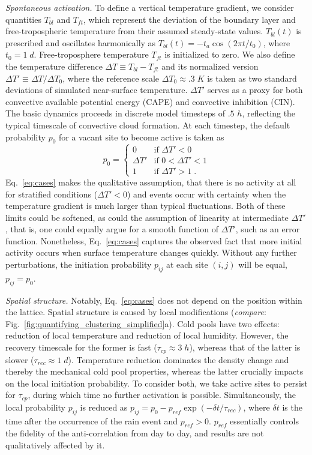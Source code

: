 \documentclass[draft,linenumbers]{agujournal2019}
\begin{document}
\noindent
{\it Spontaneous activation.}
To define a vertical temperature gradient, we consider quantities $T_{bl}$ and $T_{ft}$, which represent the deviation of the boundary layer and free-tropospheric temperature from their assumed steady-state values.
$T_{bl}(t)$ is prescribed and oscillates harmonically as $T_{bl}(t)=-t_a \cos (2\pi t/t_0)$, where $t_0=1\;d$.
Free-troposphere temperature $T_{ft}$ is initialized to zero.
We also define the temperature difference $\Delta T\equiv T_{bl}-T_{ft}$ and its normalized version $\Delta T'\equiv \Delta T/\Delta T_0$, where the reference scale $\Delta T_0\approx .3\;K$ is taken as two standard deviations of simulated near-surface temperature.
$\Delta T'$ serves as a proxy for both convective available potential energy (CAPE) and convective inhibition (CIN).
The basic dynamics proceeds in discrete model timesteps of $.5$ $h$, reflecting the typical timescale of convective cloud formation. 
At each timestep, the default probability $p_0$ for a vacant site to become active is taken as
\begin{equation}
    p_0=\begin{cases}
    0 & \text{if $\Delta T'<0$}\\
    \Delta T' & \text{if $0<\Delta T'<1$}\\
    1 & \text{if $\Delta T'>1$}\;.
    \end{cases}
    \label{eq:cases}
\end{equation}
Eq.~\ref{eq:cases} makes the qualitative assumption, that there is no activity at all for stratified conditions ($\Delta T'<0$) and events occur with certainty when the temperature gradient is much larger than typical fluctuations. 
Both of these limits could be softened, as could the assumption of linearity at intermediate $\Delta T'$, that is, one could equally argue for a smooth function of $\Delta T'$, such as an error function. 
Nonetheless, Eq.~\ref{eq:cases} captures the observed fact that more initial activity occurs when surface temperature changes quickly.
Without any further perturbations, the initiation probability $p_{ij}$ at each site $(i,j)$ will be equal, $p_{ij}=p_0$.

\noindent
{\it Spatial structure.} 
Notably, Eq.~\ref{eq:cases} does not depend on the position within the lattice. 
Spatial structure is caused by local modifications ({\it compare}: Fig.~\ref{fig:quantifying_clustering_simplified}a).
Cold pools have two effects: reduction of local temperature and reduction of local humidity. 
However, the recovery timescale for the former is fast ($\tau_{cp}\approx 3\;h$), whereas that of the latter is slower ($\tau_{rec}\approx 1\;d$).
Temperature reduction dominates the density change and thereby the mechanical cold pool properties, whereas the latter crucially impacts on the local initiation probability.
To consider both, we take active sites to persist for $\tau_{cp}$, during which time no further activation is possible.
Simultaneously, the local probability $p_{ij}$ is reduced as $p_{ij}=p_0-p_{ref}\exp(-\delta t/\tau_{rec})$, where $\delta t$ is the time after the occurrence of the rain event and $p_{ref}>0$. 
$p_{ref}$ essentially controls the fidelity of the anti-correlation from day to day, and results are not qualitatively affected by it.
\end{document}
